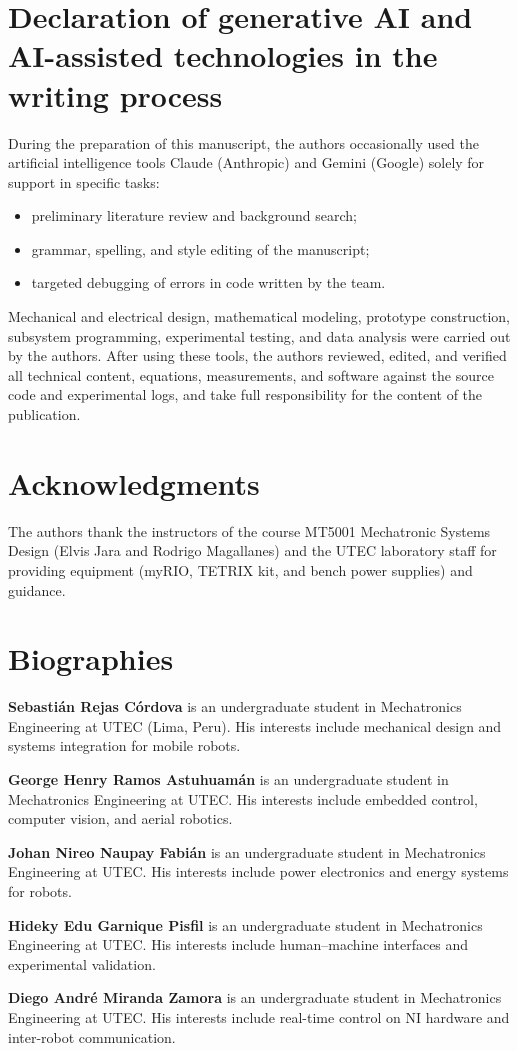 \section*{Declaration of generative AI and AI-assisted technologies in the writing process}
During the preparation of this manuscript, the authors occasionally used the artificial intelligence tools Claude (Anthropic) and Gemini (Google) solely for support in specific tasks:
\begin{itemize}
  \item preliminary literature review and background search;
  \item grammar, spelling, and style editing of the manuscript;
  \item targeted debugging of errors in code written by the team.
\end{itemize}
Mechanical and electrical design, mathematical modeling, prototype construction, subsystem programming, experimental testing, and data analysis were carried out by the authors. After using these tools, the authors reviewed, edited, and verified all technical content, equations, measurements, and software against the source code and experimental logs, and take full responsibility for the content of the publication.

\section*{Acknowledgments}
The authors thank the instructors of the course MT5001 Mechatronic Systems Design (Elvis Jara and Rodrigo Magallanes) and the UTEC laboratory staff for providing equipment (myRIO, TETRIX kit, and bench power supplies) and guidance.

\section*{Biographies}
\noindent\textbf{Sebastián Rejas Córdova} is an undergraduate student in Mechatronics Engineering at UTEC (Lima, Peru). His interests include mechanical design and systems integration for mobile robots.

\noindent\textbf{George Henry Ramos Astuhuamán} is an undergraduate student in Mechatronics Engineering at UTEC. His interests include embedded control, computer vision, and aerial robotics.

\noindent\textbf{Johan Nireo Naupay Fabián} is an undergraduate student in Mechatronics Engineering at UTEC. His interests include power electronics and energy systems for robots.

\noindent\textbf{Hideky Edu Garnique Pisfil} is an undergraduate student in Mechatronics Engineering at UTEC. His interests include human--machine interfaces and experimental validation.

\noindent\textbf{Diego André Miranda Zamora} is an undergraduate student in Mechatronics Engineering at UTEC. His interests include real-time control on NI hardware and inter-robot communication.
